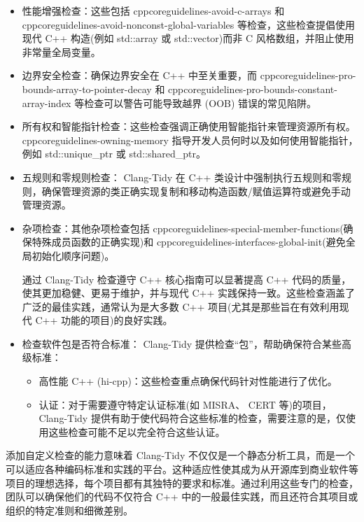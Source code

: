 \begin{itemize}
\item
性能增强检查：这些包括 cppcoreguidelines-avoid-c-arrays 和 cppcoreguidelines-avoid-nonconst-global-variables 等检查，这些检查提倡使用现代 C++ 构造(例如 std::array 或 std::vector)而非 C 风格数组，并阻止使用非常量全局变量。

\item
边界安全检查：确保边界安全在 C++ 中至关重要，而 cppcoreguidelines-pro-bounds-array-to-pointer-decay 和 cppcoreguidelines-pro-bounds-constant-array-index 等检查可以警告可能导致越界 (OOB) 错误的常见陷阱。

\item
所有权和智能指针检查：这些检查强调正确使用智能指针来管理资源所有权。 cppcoreguidelines-owning-memory 指导开发人员何时以及如何使用智能指针，例如 std::unique\_ptr 或 std::shared\_ptr。

\item
五规则和零规则检查： Clang-Tidy 在 C++ 类设计中强制执行五规则和零规则，确保管理资源的类正确实现复制和移动构造函数/赋值运算符或避免手动管理资源。

\item
杂项检查：其他杂项检查包括 cppcoreguidelines-special-member-functions(确保特殊成员函数的正确实现)和 cppcoreguidelines-interfaces-global-init(避免全局初始化顺序问题)。

通过 Clang-Tidy 检查遵守 C++ 核心指南可以显著提高 C++ 代码的质量，使其更加稳健、更易于维护，并与现代 C++ 实践保持一致。这些检查涵盖了广泛的最佳实践，通常认为是大多数 C++ 项目(尤其是那些旨在有效利用现代 C++ 功能的项目)的良好实践。

\item
检查软件包是否符合标准： Clang-Tidy 提供检查“包”，帮助确保符合某些高级标准：

\begin{itemize}
\item
高性能 C++ (hi-cpp)：这些检查重点确保代码针对性能进行了优化。

\item
认证：对于需要遵守特定认证标准(如 MISRA、 CERT 等)的项目， Clang-Tidy 提供有助于使代码符合这些标准的检查，需要注意的是，仅使用这些检查可能不足以完全符合这些认证。
\end{itemize}
\end{itemize}

添加自定义检查的能力意味着 Clang-Tidy 不仅仅是一个静态分析工具，而是一个可以适应各种编码标准和实践的平台。这种适应性使其成为从开源库到商业软件等项目的理想选择，每个项目都有其独特的要求和标准。通过利用这些专门的检查，团队可以确保他们的代码不仅符合 C++ 中的一般最佳实践，而且还符合其项目或组织的特定准则和细微差别。

